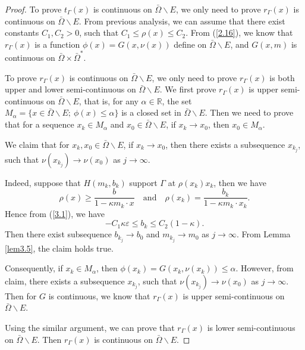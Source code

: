 \documentclass[a4paper,12pt,]{article}
\numberwithin{equation}{section}
\numberwithin{equation}{section} \allowdisplaybreaks
\begin{document}
\begin{proof}
  To prove $t_{\Gamma}(x)$ is continuous on $\bar{\Omega}\backslash E$, we only need to prove $r_{\Gamma}(x)$ is continuous on $\bar{\Omega}\backslash E$. From previous analysis, we can assume that there exist constants $C_{1},C_{2}>0$, such that $C_{1} \leq \rho(x) \leq C_{2}$. From (\ref{2.16}), we know that $r_{\Gamma}(x)$ is a function $\phi(x) = G(x,\nu(x))$ define on $\bar{\Omega}\backslash E$, and $G(x,m)$ is continuous on $\bar{\Omega} \times \bar{\Omega}^{\ast}$.

  To prove $r_{\Gamma}(x)$ is continuous on $\bar{\Omega}\backslash E$, we only need to prove $r_{\Gamma}(x)$ is both upper and lower semi-continuous on $\bar{\Omega}\backslash E$. We first prove  $r_{\Gamma}(x)$ is upper semi-continuous on $\bar{\Omega}\backslash E$, that is, for any $\alpha \in \mathbb{R}$, the set $M_{\alpha} = \{x \in \bar{\Omega}\backslash E;~\phi(x)\leq \alpha\}$ is a closed set in $\bar{\Omega}\backslash E$. Then we need to prove that for a sequence $x_{k} \in M_{\alpha}$ and $x_{0} \in \bar{\Omega}\backslash E$, if $x_{k} \rightarrow x_{0}$, then $x_{0} \in M_{\alpha}$.

  We claim that for $x_{k},x_{0} \in \bar{\Omega}\backslash E$, if $x_{k} \rightarrow x_{0}$, then there exists a subsequence $x_{k_{j}}$, such that $\nu(x_{k_{j}})\rightarrow \nu(x_{0})$ as $j\rightarrow \infty$.

  Indeed, suppose that $H(m_{k},b_{k})$ support $\Gamma$ at $\rho(x_{k})x_{k}$, then we have
  $$\rho(x) \geq \frac{b}{1 - \kappa m_{k} \cdot x} \quad \text{and} \quad \rho(x_{k}) = \frac{b_{k}}{1 - \kappa m_{k} \cdot x_{k}}.$$
  Hence from (\ref{3.1}), we have
  $$-C_{1}\kappa \varepsilon \leq b_{k} \leq C_{2}(1 - \kappa).$$
  Then there exist subsequence $b_{k_{j}}\rightarrow b_{0}$ and $m_{k_{j}}\rightarrow m_{0}$ as $j \rightarrow \infty$. From Lemma \ref{lem3.5}, the claim holds true.

  Consequently, if $x_{k} \in M_{\alpha}$, then $\phi(x_{k}) = G(x_{k},\nu(x_{k})) \leq \alpha$. However, from claim, there exists a subsequence $x_{k_{j}}$, such that $\nu(x_{k_{j}})\rightarrow \nu(x_{0})$ as $j\rightarrow \infty$. Then for $G$ is continuous, we know that $r_{\Gamma}(x)$ is upper semi-continuous on $\bar{\Omega}\backslash E$.

  Using the similar argument, we can prove that $r_{\Gamma}(x)$ is lower semi-continuous on $\bar{\Omega}\backslash E$. Then $r_{\Gamma}(x)$ is continuous on $\bar{\Omega}\backslash E$.
\end{proof}
\end{document}
